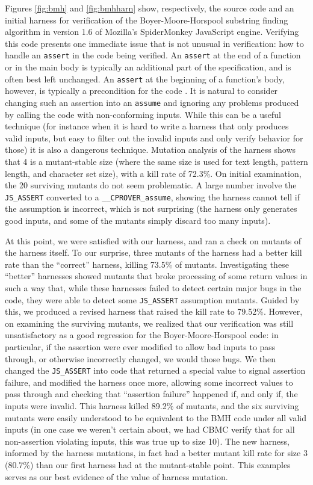 \documentclass{svjour3}
\begin{document}
Figures \ref{fig:bmh} and \ref{fig:bmhharn} show, respectively, the
source code and an initial harness for verification of the
Boyer-Moore-Horspool substring finding algorithm \cite{BMH,CFV13} in
version 1.6 of Mozilla's SpiderMonkey JavaScript engine.  Verifying
this code presents one immediate issue that is not unusual in
verification: how to handle an {\tt assert} in the code being
verified.  An {\tt assert} at the end of a function or in the main
body is typically an additional part of the specification, and is
often best left unchanged.  An {\tt assert} at the beginning of a
function's body, however, is typically a precondition for the code \cite{CFV13}.  It is natural to consider changing such an assertion into
an {\tt assume} and ignoring any problems produced by calling the code
with non-conforming inputs.  While this can be a useful technique (for
instance when it is hard to write a harness that only produces valid
inputs, but easy to filter out the invalid inputs and only verify
behavior for those) it is also a dangerous technique.  Mutation
analysis of the harness shows that 4 is a mutant-stable size (where
the same size is used for text length, pattern length, and character
set size), with a kill rate of 72.3\%.  On initial examination, the 20
surviving mutants do not seem problematic.  A large number involve the
{\tt JS\_ASSERT} converted to a {\tt \_\_CPROVER\_assume}, showing the
harness cannot tell if the assumption is incorrect, which is not
surprising (the harness only generates good inputs, and some of the
mutants simply discard too many inputs).

At this point, we were satisfied with our harness, and ran a check on
mutants of the harness itself.  To our surprise, three mutants of the
harness had a better kill rate than the ``correct'' harness, killing
73.5\% of mutants.  Investigating these ``better'' harnesses showed
mutants that broke processing of some return values in such a way
that, while these harnesses failed to detect certain major bugs in the
code, they were able to detect some {\tt JS\_ASSERT} assumption
mutants.  Guided by this, we produced a revised harness that raised
the kill rate to 79.52\%.  However, on examining the surviving
mutants, we realized that our verification was still unsatisfactory as
a good regression for the Boyer-Moore-Horspool code: in particular, if
the assertion were ever modified to allow bad inputs to pass through,
or otherwise incorrectly changed, we would those bugs.  We then
changed the {\tt JS\_ASSERT} into code that returned a special value
to signal assertion failure, and modified the harness once more,
allowing some incorrect values to pass through and checking that
``assertion failure'' happened if, and only if, the inputs were
invalid.  This harness killed 89.2\% of mutants, and the six surviving
mutants were easily understood to be equivalent to the BMH code under
all valid inputs (in one case we weren't certain about, we had CBMC
verify that for all non-assertion violating inputs, this was true up
to size 10).  The new harness, informed by the harness mutations, in
fact had a better mutant kill rate for size 3 (80.7\%) than our first
harness had at the mutant-stable point.  This examples serves as our
best evidence of the value of harness mutation.
\end{document}
